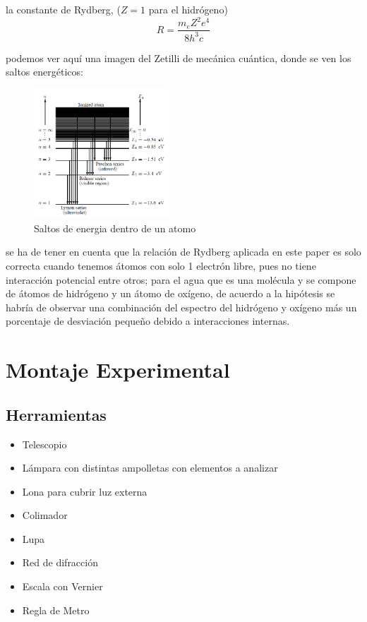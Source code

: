 \documentclass[a4paper,twocolumn,10pt]{article}
\begin{document}
la constante de Rydberg, ($Z=1$ para el hidrógeno)
$$
R = \frac{m_e Z^2 e^4}{8 h^3 c}
$$


podemos ver aquí una imagen del Zetilli \cite{zetilli} de mecánica cuántica, donde se ven los saltos energéticos:
\begin{figure}[H]
    \centering \includegraphics[width=0.45\textwidth]{Imagenes/Rydberg/transicionatomica.png}
    \caption{Saltos de energia dentro de un atomo}
    \label{fig:atomicjumps}
\end{figure}

se ha de tener en cuenta que la relación de Rydberg aplicada en este paper es solo correcta cuando tenemos átomos con solo 1 electrón libre, pues no tiene interacción potencial entre otros; para el agua que es una molécula y se compone de átomos de hidrógeno y un átomo de oxígeno, de acuerdo a la hipótesis se habría de observar una combinación del espectro del hidrógeno y oxígeno más un porcentaje de desviación pequeño debido a interacciones internas.

\section{Montaje Experimental}

\subsection{Herramientas}
\begin{itemize} 
\item Telescopio
\item Lámpara con distintas ampolletas con elementos a analizar
\item Lona para cubrir luz externa
\item Colimador
\item Lupa
\item Red de difracción
\item Escala con Vernier
\item Regla de Metro
\end{itemize}
\end{document}
